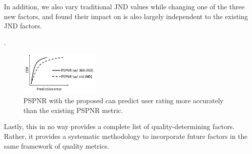 In addition, we also vary traditional JND values while changing one of the three new factors, and found their impact on \vrjnd is also largely independent to the existing JND factors.


.

\begin{figure}
  \centering
  \includegraphics[width=0.35\textwidth]{figures/pspnr-accuracy.pdf}
  \caption{PSPNR with the proposed \vrjnd can predict user rating more accurately than the  existing PSPNR metric.}
  \label{fig:pspnr-accuracy}
 \end{figure}

Lastly, this in no way provides a complete list of quality-determining factors. 
Rather, it provides a systematic methodology to incorporate future factors in the same framework of \vrvideo quality metrics.








